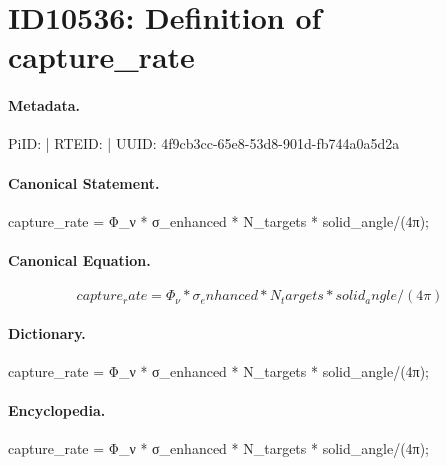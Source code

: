 \section*{ID10536: Definition of capture\_rate}
\paragraph{Metadata.}
PiID:  | RTEID:  | UUID: 4f9cb3cc-65e8-53d8-901d-fb744a0a5d2a

\paragraph{Canonical Statement.}
capture\_rate = Φ\_ν * σ\_enhanced * N\_targets * solid\_angle/(4π);

\paragraph{Canonical Equation.}
\[
capture_rate = Φ_ν * σ_enhanced * N_targets * solid_angle/(4π)
\]

\paragraph{Dictionary.}
capture\_rate = Φ\_ν * σ\_enhanced * N\_targets * solid\_angle/(4π);

\paragraph{Encyclopedia.}
capture\_rate = Φ\_ν * σ\_enhanced * N\_targets * solid\_angle/(4π);

